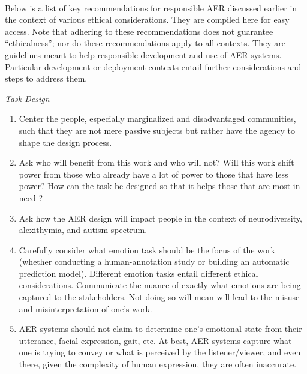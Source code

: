 \documentclass{clv3}
\begin{document}
\vspace*{10mm}
\\

\noindent Below is a list of key recommendations for responsible AER discussed earlier in the context of various ethical considerations. They are compiled here for easy access. Note that adhering to these recommendations does not guarantee ``ethicalness''; nor do these recommendations apply to all contexts. They are guidelines meant to help responsible development and use of AER systems. Particular development or deployment contexts entail further considerations and steps to address them.


{\small
\vspace*{5mm}
\noindent \textit{Task Design}
\begin{enumerate}

\item Center the people, especially marginalized and disadvantaged communities, such that they are not mere passive subjects but rather have the agency to shape the design process. 

\item Ask who will benefit from this work and who will not? Will this work shift power from those who already have a lot of power to those that have less power? How can the task be designed so that it helps those that are most in need ?


\item Ask how the AER design will impact people in the context of  neurodiversity, alexithymia, and autism spectrum. 

\item Carefully consider what emotion task should be the focus of the work (whether conducting a human-annotation study or building an automatic prediction model). Different emotion tasks entail different ethical considerations.
Communicate the nuance of exactly what emotions are being captured to the stakeholders. Not doing so will mean will lead to the misuse and misinterpretation of one’s work.

\item AER systems should not claim to determine one's emotional state from their utterance, facial expression, gait, etc. At best, AER systems capture what one is trying to convey or what is perceived by the listener/viewer, and even there, given the complexity of human expression, they are often inaccurate.


\end{enumerate}}
\end{document}
